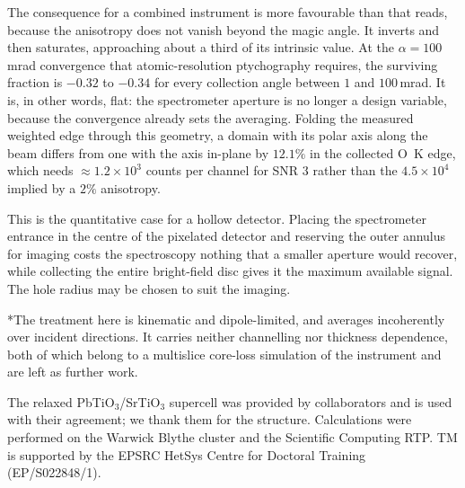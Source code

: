 \documentclass[aps,prb,twocolumn,superscriptaddress,floatfix,nofootinbib]{revtex4-2}
\begin{document}
The consequence for a combined instrument is more favourable than that reads, because the
anisotropy does not vanish beyond the magic angle. It inverts and then saturates, approaching
about a third of its intrinsic value. At the $\alpha=100$\,mrad convergence that atomic-resolution
ptychography requires, the surviving fraction is $-0.32$ to $-0.34$ for every collection angle
between $1$ and $100$\,mrad. It is, in other words, flat: the spectrometer aperture is no longer a
design variable, because the convergence already sets the averaging. Folding the measured
weighted edge through this geometry, a domain with its polar axis along the beam differs from one
with the axis in-plane by $12.1\%$ in the collected O~K edge, which needs $\approx1.2\times10^{3}$
counts per channel for SNR $3$ rather than the $4.5\times10^{4}$ implied by a $2\%$ anisotropy.

This is the quantitative case for a hollow detector. Placing the spectrometer entrance in the
centre of the pixelated detector and reserving the outer annulus for imaging costs the
spectroscopy nothing that a smaller aperture would recover, while collecting the entire
bright-field disc gives it the maximum available signal. The hole radius may be chosen to suit
the imaging.

*The treatment here is kinematic and dipole-limited, and averages incoherently over incident
directions. It carries neither channelling nor thickness dependence, both of which belong to a
multislice core-loss simulation of the instrument and are left as further work.

\begin{acknowledgments}
The relaxed PbTiO$_3$/SrTiO$_3$ supercell was provided by collaborators and is used with their
agreement; we thank them for the structure. Calculations were performed on the Warwick Blythe
cluster and the Scientific Computing RTP. TM is supported by the EPSRC HetSys Centre for
Doctoral Training (EP/S022848/1).
\end{acknowledgments}



\end{document}
